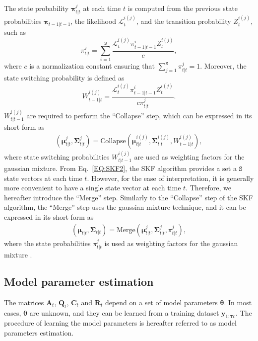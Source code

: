 The state probability $\mathbf{\pi}_{t|t}^{j}$ at each time $t$ is computed from the previous state probabilities $\bm{\pi}_{t-1|t-1}$, the likelihood $\mathcal{L}_{t}^{i(j)}$, and the transition probability $Z_{t}^{i(j)}$, such as
\begin{equation}
\pi_{t|t}^{j} = \sum_{i=1}^{\mathtt{S}} \frac{\mathcal{L}_{t}^{i(j)} \pi_{t-1|t-1}^{i} Z^{i(j)}_{t} }{c},
\label{EQ:StateProbability}
\end{equation}
where $c$ is a normalization constant ensuring that $ \sum_{j=1}^{\mathtt{S}} \pi_{t|t}^{j} = 1 $.
Moreover, the state switching probability is defined as
\begin{equation}
W_{t-1|t}^{i(j)} = \frac{\mathcal{L}_{t}^{i(j)} \pi_{t-1|t-1}^{i} Z^{i(j)}_{t} }{c\pi_{t|t}^{j}}.
\label{EQ:StateSwitchingProbability}
\end{equation}
$W_{t|t-1}^{i(j)}$ are required to perform the ``Collapse'' step, which can be expressed in its short form as
\begin{equation}
  \begin{split}
  (\bm{\mu}_{t|t}^{j},\bm{\Sigma}_{t|t}^{j}) = \text{Collapse}(\bm{\mu}_{t|t}^{i(j)},\bm{\Sigma}_{t|t}^{i(j)}, W_{t-1|t}^{i(j)} ),
    \end{split}
\label{EQ:SKF2}
\end{equation}
where state switching probabilities $W_{t|t-1}^{i(j)}$ are used as weighting factors for the gaussian mixture.
From Eq.~\ref{EQ:SKF2}, the SKF algorithm provides a set a $\mathtt{S}$ state vectors at each time $t$.
However, for the ease of interpretation, it is generally more convenient to have a single state vector at each time $t$.
Therefore, we hereafter introduce the ``Merge'' step.
Similarly to the ``Collapse'' step of the SKF algorithm, the ``Merge'' step uses the gaussian mixture technique, and it can be expressed in its short form as
\begin{equation}
  \begin{split}
  (\bm{\mu}_{t|t},\bm{\Sigma}_{t|t}) = \text{Merge}(\bm{\mu}_{t|t}^{j},\bm{\Sigma}_{t|t}^{j},  \pi_{t|t}^{j} ),
    \end{split}
\label{EQ:SKFCollapse}
\end{equation}
where the state probabilities $\pi_{t|t}^{j}$ is used as weighting factors for the gaussian mixture \cite{Nguyen2018}.

\subsection{Model parameter estimation}
\label{SS:THModelParameterEstimation}
The matrices $\mathbf{A}_{t}$,  $\mathbf{Q}_{t}$,   $\mathbf{C}_{t}$ and  $\mathbf{R}_{t}$ depend on a set of model parameters $\bm{\theta}$.
In most cases, $\bm{\theta}$ are unknown, and they can be learned from a training dataset $\mathbf{y}_{1:\mathtt{Tr}}$.
The procedure of learning the model parameters is hereafter referred to as model parameters estimation.
